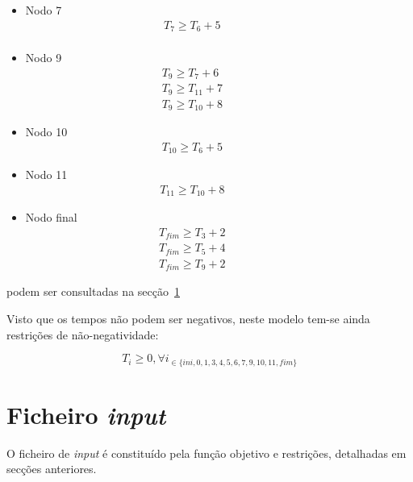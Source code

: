 \begin{itemize}
\item Nodo 7
\begin{align*}
       T_7 \ge T_6 + 5  &         &         &         &         &         &\\
	\end{align*}


\item Nodo 9
\begin{align*}
T_9 \ge T_7 + 6   &         &         &         &         &         &\\
T_9 \ge T_{11} + 7 &         &         &         &         &         &\\
T_9 \ge T_{10} + 8 &         &         &         &         &         &
	\end{align*}


\item Nodo 10
\begin{align*}
		T_{10} \ge T_6 + 5 &         &         &         &         &         &
	\end{align*}

\item Nodo 11
\begin{align*}
		T_{11} \ge T_{10} + 8 &         &         &         &         &         &	
\end{align*}



\item Nodo final
\begin{align*}
		T_{fim} \ge T_3 + 2 &         &         &         &         &         &\\
T_{fim} \ge T_5 + 4 &         &         &         &         &         &\\
T_{fim} \ge T_9 + 2 &         &         &         &         &         &
	\end{align*}


\end{itemize}

podem ser consultadas na secção~\ref{p2:sec:ficheiro_input}

Visto que os tempos não podem ser negativos, neste modelo tem-se ainda
restrições de não-negatividade:

\begin{displaymath} T_{i} \geq 0, \forall i_{\in\{ini, 0, 1, 3,
	4,5,6,7,9,10,11,fim\}} \end{displaymath}


\section{Ficheiro \emph{input}}
\label{p2:sec:ficheiro_input}
O ficheiro de \emph{input} é constituído pela função objetivo e restrições, detalhadas
em secções anteriores.


